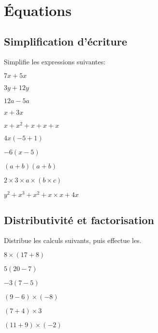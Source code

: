 \section{Équations}

\subsection*{Simplification d'écriture}

\begin{exercicefr}
    Simplifie les expressions suivantes:
    \begin{exerciceenum}
        \item $7x+5x$
        \item $3y+12y$
        \item $12a-5a$
        \item $x+3x$
        \item $x+x^2+x+x+x$
        \item $4x(-5 + 1)$
        \item $-6(x - 5)$
        \item $(a+b)(a+b)$
        \item $2\times 3 \times a\times (b\times c)$
        \item $y^2 + x^3 + x^2 + x\times x + 4x$
    \end{exerciceenum}
\end{exercicefr}

\subsection*{Distributivité et factorisation}

\begin{exercicefr}
    Distribue les calculs suivants, puis effectue les.
    \begin{exerciceenum}
        \item $8\times (17 + 8)$
        \item $5(20 - 7)$
        \item $-3(7-5)$
        \item $(9 - 6) \times (-8)$
        \item $(7 + 4) \times 3$
        \item $(11 + 9) \times (-2)$
    \end{exerciceenum}
\end{exercicefr}

